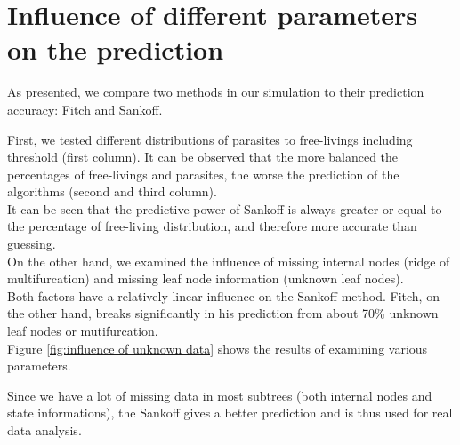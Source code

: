   \section{Influence of different parameters on the prediction} \label{sec:results - simulation}
    As presented, we compare two methods in our simulation to their prediction accuracy: Fitch and 
      Sankoff.

    First, we tested different distributions of parasites to free-livings including threshold (first 
      column). It can be observed that the more balanced the percentages of free-livings and parasites, 
      the worse the prediction of the algorithms (second and third column). \\
    It can be seen that the predictive power of Sankoff is always greater or equal to the percentage
      of free-living distribution, and therefore more accurate than guessing. \\
    On the other hand, we examined the influence of missing internal nodes (ridge of multifurcation) 
      and missing leaf node information (unknown leaf nodes). \\
    Both factors have a relatively linear influence on the Sankoff method. Fitch, on the other hand, 
      breaks significantly in his prediction from about 70\% unknown leaf nodes or mutifurcation. \\
    Figure \ref{fig:influence of unknown data} shows the results of examining various parameters.

    Since we have a lot of missing data in most subtrees (both internal nodes and state informations), 
      the Sankoff gives a better prediction and is thus used for real data analysis.

